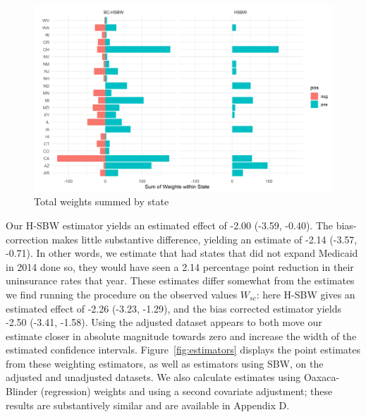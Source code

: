 \documentclass[12pt]{article}
\begin{document}
\begin{figure}[B]
\begin{center}
    \includegraphics[scale=0.6]{01_Plots/weights-by-state-main.png}
    \caption{Total weights summed by state}
    \label{fig:statewghts}
\end{center}
\end{figure}

Our H-SBW estimator yields an estimated effect of -2.00 (-3.59, -0.40). The bias-correction makes little substantive difference, yielding an estimate of -2.14 (-3.57, -0.71). In other words, we estimate that had states that did not expand Medicaid in 2014 done so, they would have seen a 2.14 percentage point reduction in their uninsurance rates that year. These estimates differ somewhat from the estimates we find running the procedure on the observed values $W_{sc}$: here H-SBW gives an estimated effect of -2.26 (-3.23, -1.29), and the bias corrected estimator yields -2.50 (-3.41, -1.58). Using the adjusted dataset appears to both move our estimate closer in absolute magnitude towards zero and increase the width of the estimated confidence intervals. Figure~\ref{fig:estimators} displays the point estimates from these weighting estimators, as well as estimators using SBW, on the adjusted and unadjusted datasets. We also calculate estimates using Oaxaca-Blinder (regression) weights and using a second covariate adjustment; these results are substantively similar and are available in Appendix D. 
\end{document}
